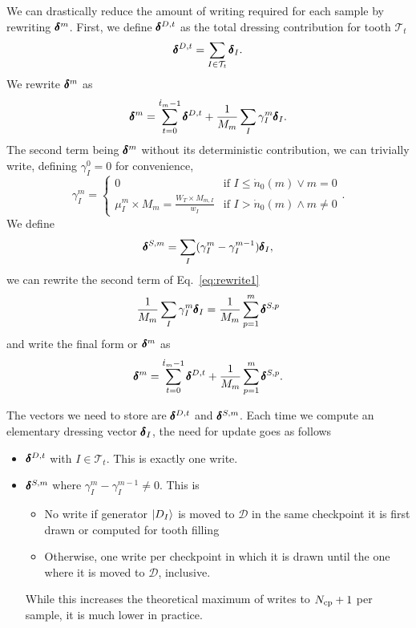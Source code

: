 \documentclass[./thesis.tex]{subfiles}
\begin{document}
We can drastically reduce the amount of writing required for each sample by rewriting $\pmb \delta^m$.
First, we define $\pmb \delta^{D,t}$ as the total dressing contribution for tooth $\mathcal{T}_t$
\begin{equation}
\pmb \delta^{D,t} = \sum_{I \in \mathcal{T}_t} \pmb \delta_I.
\end{equation}
We rewrite $\pmb \delta^m$ as
\begin{equation}
\label{eq:rewrite1}
\pmb \delta^{m} = \sum_{t=0}^{\dot t_m - 1} \pmb \delta^{D,t}+ \frac{1}{M_m} \sum_{I} \gamma^m_{I} \pmb \delta_I.
\end{equation}
The second term being $\pmb \delta^m$ without its deterministic contribution, we can trivially write, defining $\gamma^ 0_I=0$ for convenience,
\begin{equation}
\gamma^m_I = 
\begin{cases}
0 & \text{if } I \leq \dot n_0(m) \vee m=0 \\
\mu^m_I \times M_m = \frac{W_T \times M_{m,I}}{w_I} & \text{if } I > \dot n_0(m) \wedge m \neq 0
\end{cases}.
\end{equation}
We define
\begin{align}
\pmb \delta^{S,m} = \sum_I (\gamma^m_I - \gamma^{m-1}_I) \pmb \delta_I,
\end{align}
we can rewrite the second term of Eq.~\eqref{eq:rewrite1}
\begin{equation}
\frac{1}{M_m}\sum_{I} \gamma^m_{I} \pmb \delta_I = \frac{1}{M_m} \sum_{p=1}^m \pmb \delta^{S,p}
\end{equation}
and write the final form or $\pmb \delta^m$ as
\begin{equation}
\pmb \delta^m=\sum_{t=0}^{\dot t_{m}-1} \pmb \delta^{D,t} + \frac{1}{M_m} \sum_{p=1}^m \pmb \delta^{S,p}.
\end{equation}

The vectors we need to store are $\pmb \delta^{D,t}$ and $\pmb \delta^{S,m}$. Each time we compute an elementary dressing vector $\pmb \delta_I$, the need for update goes as follows
\begin{itemize}
\item
$\pmb \delta^{D,t}$ with $I \in \mathcal{T}_t$. This is exactly one write.
\item
$\pmb \delta^{S,m}$ where $\gamma^m_I - \gamma^{m-1}_I \neq 0$. This is
 \begin{itemize}
 \item No write if generator $\ket{D_I}$ is moved to $\mathcal{D}$ in the same checkpoint it is first drawn or computed for tooth filling
 \item Otherwise, one write per checkpoint in which it is drawn until the one where it is moved to $\mathcal{D}$, inclusive.
 \end{itemize}
 While this increases the theoretical maximum of writes to ${N_\text{cp}}+1$ per sample, it is much lower in practice.
\end{itemize}
\end{document}
